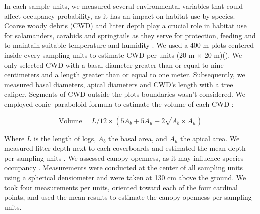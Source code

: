 In each sample units, we measured several environmental variables that could affect occupancy probability, as it has an impact on habitat use by species.
Coarse woody debris (CWD) and litter depth play a crucial role in habitat use for salamanders, carabids and springtails as
they serve for protection, feeding and to maintain suitable temperature and humidity \citep{birdChangesSoilLitter2004,groverInfluenceCoverMoisture1998a,harmonEcologyCoarseWoody1986,koivula.LeafLitterSmallscale1999,mckennyEffectsStructuralComplexity2006,patrickEffectsExperimentalForestry2006a}. 
We used a 400 m plots centered inside every sampling units to estimate CWD per units (20 m $\times$  20 m)(\citealp{methotGuideInventaireEchantillonnage2014}). 
We only selected CWD with a basal diameter greater than or equal to nine centimeters and a length greater than or equal to one meter.
Subsequently, we measured basal diameters, apical diameters and CWD's length with a tree caliper. 
Segments of CWD outside the plots boundaries wasn't considered.
We employed \cite{fraverRefiningVolumeEstimates2007} conic–paraboloid formula to estimate the volume of each CWD :

\begin{equation}
  \text{Volume} = L/12 \times (5A_b + 5A_u + 2\sqrt{A_b \times A_u})
\end{equation}

\vspace{0.5cm}

Where $L$ is the length of logs, $A_b$ the basal area, and $A_u$ the apical area.
We measured litter depth next to each coverboards and estimated the mean depth per sampling units \citep{mazerolleWoodlandSalamanderPopulation2021a}. 
We assessed canopy openness, as it may influence species occupancy \citep{henneronForestPlantCommunity2017,koivulaBorealCarabidbeetleColeoptera2002a,kotzeFortyYearsCarabid2011a,messereForestFloorDistribution1998,tilghmanMetaanalysisEffectsCanopy2012}.
Measurements were conducted at the center of all sampling units using a spherical densiometer \citep{lemmonSphericalDensiometerEstimating1956} and were taken at 130 cm above the ground. 
We took four measurements per units, oriented toward each of the four cardinal points, and used the mean results to estimate the canopy openness per sampling units.

